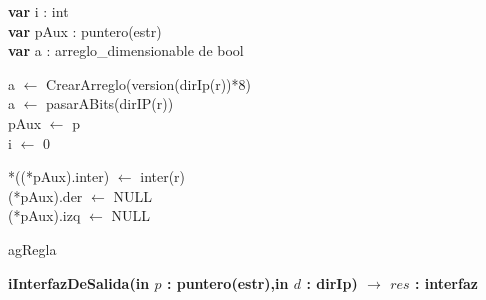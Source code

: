 	\begin{algorithm}[H]
\BlankLine
	
\textbf{var} i : int\\
\textbf{var} pAux : puntero(estr) 	\\
\textbf{var} a : arreglo\_dimensionable de bool\\

\BlankLine 

a $\leftarrow$ CrearArreglo(version(dirIp(r))*8)\\

\BlankLine
{}
\BlankLine 
a $\leftarrow$ pasarABits(dirIP(r))\\
pAux $\leftarrow$ p\\
i $\leftarrow$ 0

\BlankLine 

\BlankLine 
{}
\BlankLine 
*((*pAux).inter) $\leftarrow$ inter(r)\\
(*pAux).der $\leftarrow$ NULL\\
(*pAux).izq $\leftarrow$ NULL

 \caption{agRegla}
   \end{algorithm}




\newpage


\textbf{iInterfazDeSalida(in $p$ : puntero(estr),in $d$ : dirIp)   $\longrightarrow$	$res$ : interfaz
}
    \incmargin{1em}
    \linesnumbered
    \dontprintsemicolon
    
